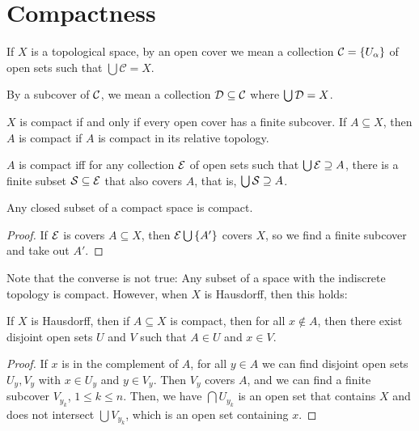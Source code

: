 \chapter{Compactness}

\begin{definition}
    If $X$ is a topological space, by an open cover we mean a collection $\mathcal C = \qty{U_\alpha}$ of open sets such that $\bigcup \mathcal C = X$.

    By a subcover of $\mathcal C$, we mean a collection $\mathcal D \subseteq \mathcal C$ where $\bigcup \mathcal D = X$.
\end{definition}

\begin{definition}[Compactness]
    $X$ is compact if and only if every open cover has a finite subcover. If $A \subseteq X$, then $A$ is compact if $A$ is compact in its relative topology.
\end{definition}

\begin{proposition}
    $A$ is compact iff for any collection $\mathcal E$ of open sets such that $\bigcup \mathcal E \supseteq A$, there is a finite subset $\mathcal S \subseteq \mathcal E$ that also covers $A$, that is, $\bigcup \mathcal S \supseteq A$. 
\end{proposition}

\begin{proposition}
    Any closed subset of a compact space is compact.
\end{proposition}

\begin{proof}
    If $\mathcal E$ is covers $A \subseteq X$, then $\mathcal E \bigcup \qty{A'}$ covers $X$, so we find a finite subcover and take out $A'$.
\end{proof}

Note that the converse is not true: Any subset of a space with the indiscrete topology is compact. However, when $X$ is Hausdorff, then this holds:

\begin{proposition}
    If $X$ is Hausdorff, then if $A \subseteq X$ is compact, then for all $x \notin A$, then there exist disjoint open sets $U$ and $V$ such that $A \in U$ and $x \in V$.
\end{proposition}

\begin{proof}
    If $x$ is in the complement of $A$, for all $y \in A$ we can find disjoint open sets $U_y, V_y$ with $x\in U_y$ and $y \in V_y$. Then $V_y$ covers $A$, and we can find a finite subcover $V_{y_k}$, $1 \le k \le n$. Then, we have $\bigcap U_{y_k}$ is an open set that contains $X$ and does not intersect $\bigcup V_{y_k}$, which is an open set containing $x$.
\end{proof}


